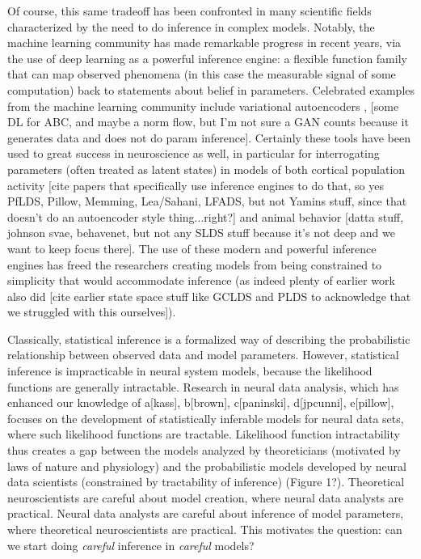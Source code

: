 \documentclass[11pt]{article}
\begin{document}
Of course, this same tradeoff has been confronted in many scientific fields characterized by the need to do inference in complex models.  Notably, the machine learning community has made remarkable progress in recent years, via the use of deep learning as a powerful inference engine: a flexible function family that can map observed phenomena (in this case the measurable signal of some computation) back to statements about belief in parameters.  Celebrated examples from the machine learning community include variational autoencoders \cite{}, [some DL for ABC, and maybe a norm flow, but I'm not sure a GAN counts because it generates data and does not do param inference].  Certainly these tools have been used to great success in neuroscience as well, in particular for interrogating parameters (often treated as latent states) in models of both cortical population activity [cite papers that specifically use inference engines to do that, so yes PfLDS, Pillow, Memming, Lea/Sahani, LFADS, but not Yamins stuff, since that doesn't do an autoencoder style thing...right?]  and animal behavior [datta stuff, johnson svae, behavenet, but not any SLDS stuff because it's not deep and we want to keep focus there].  The use of these modern and powerful inference engines has freed the researchers creating models from being constrained to simplicity that would accommodate inference (as indeed plenty of earlier work also did [cite earlier state space stuff like GCLDS and PLDS to acknowledge that we struggled with this ourselves]).




Classically, statistical inference is a formalized way of describing the probabilistic relationship between observed data and model parameters.  However, statistical inference is impracticable in neural system models, because the likelihood functions are generally intractable.  Research in neural data analysis, which has enhanced our knowledge of a[kass], b[brown], c[paninski], d[jpcunni], e[pillow], focuses on the development of statistically inferable models for neural data sets, where such likelihood functions are tractable. Likelihood function intractability thus creates a gap between the models analyzed by theoreticians (motivated by laws of nature and physiology) and the probabilistic models developed by neural data scientists (constrained by tractability of inference) (Figure 1?).   Theoretical neuroscientists are careful about model creation, where neural data analysts are practical.  Neural data analysts are careful about inference of model parameters, where theoretical neuroscientists are practical.  This motivates the question: can we start doing \emph{careful} inference in \emph{careful} models? \\
\end{document}
